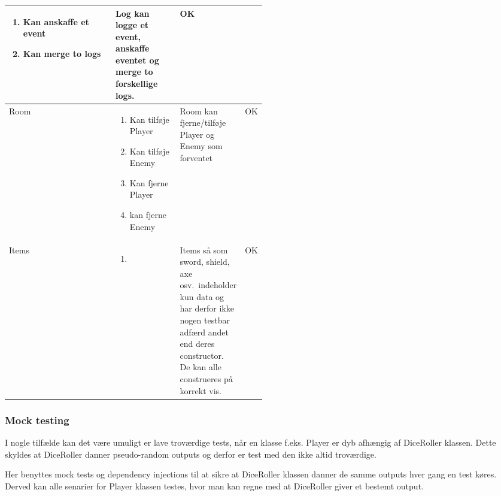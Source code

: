 \begin{center}
\begin{longtable}{|l|p{0.25\linewidth}|p{0.25\linewidth}|l|}
\begin{enumerate}
    \item \begin{flushleft} Kan anskaffe et event \end{flushleft}
    \item \begin{flushleft} Kan merge to logs \end{flushleft}
  \end{enumerate}
  &
  \flushleft
  Log kan logge et event, anskaffe eventet og merge to forskellige logs.
  &
  OK
  \\ \hline
  Room                          
  & 
  \begin{enumerate}
    \item Kan tilføje Player
    \item Kan tilføje Enemy
    \item Kan fjerne Player
    \item kan fjerne Enemy
  \end{enumerate}
  &
  \flushleft
  Room kan fjerne/tilføje Player og Enemy som forventet
  &
  OK
  \\ \hline
  Items
  &
  \begin{enumerate}
    \item[]
  \end{enumerate}
  &
  \flushleft
  Items så som sword, shield, axe osv.\ indeholder kun data og har derfor ikke nogen
  testbar adfærd andet end deres constructor. De kan alle construeres på korrekt vis.
  &
  OK
  \\ \hline
\end{longtable}
\addtocounter{table}{-1}
\end{center}

\newpage 

\subsubsection{Mock testing}
I nogle tilfælde kan det være umuligt er lave troværdige tests, når
en klasse f.eks. Player er dyb afhængig af DiceRoller klassen. Dette skyldes
at DiceRoller danner pseudo-random outputs og derfor er test med den ikke 
altid troværdige.

Her benyttes mock tests og dependency injections til at sikre at DiceRoller 
klassen danner de samme outputs hver gang en test køres.
Derved kan alle senarier for Player klassen testes, hvor man kan regne med at DiceRoller giver et bestemt output. 

